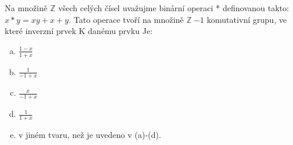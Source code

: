 \subsubsection{}
Na množině $\mathbb{Z}$ všech celých čísel uvažujme binární operaci *
definovanou takto: $x*y=xy + x + y$. Tato operace tvoří na množině $\mathbb{Z} \
{-1}$ komutativní grupu, ve které inverzní prvek K danému prvku Je:

\begin{enumerate}[a)]
  \item $\frac{1-x}{1+x}$
  \item $\frac{1}{-1+x}$
  \item $\frac{x}{-1+x}$
  \item $\frac{1}{1+x}$
  \item v jiném tvaru, než je uvedeno v (a)-(d).
\end{enumerate}
